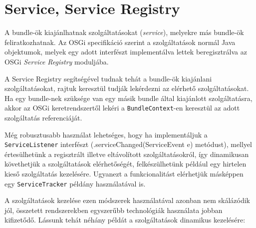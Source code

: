 \section{Service, Service Registry}
\label{sec:service}

A bundle-ök kiajánlhatnak szolgáltatásokat (\textit{service}), melyekre más bundle-ök feliratkozhatnak. Az OSGi specifikáció szerint a szolgáltatások normál Java objektumok, melyek egy adott interfészt implementálva lettek beregisztrálva az OSGi \textit{Service Registry} moduljába.

A Service Registry segítségével tudnak tehát a bundle-ök kiajánlani szolgáltatásokat, rajtuk keresztül tudják lekérdezni az elérhető szolgáltatásokat. Ha egy bundle-nek szüksége van egy másik bundle által kiajánlott szolgáltatásra, akkor az OSGi keretrendszertől lekéri a \texttt{BundleContext}-en keresztül az adott szolgáltatás referenciáját.

Még robusztusabb használat lehetséges, hogy ha implementáljuk a \texttt{ServiceListener} interfészt (.serviceChanged(ServiceEvent e) metódust), mellyel értesülhetünk a regisztrált illetve eltávolított szolgáltatásokról, így dinamikusan követhetjük a szolgáltatások elérhetőségét, felkészülhetünk például egy hirtelen kieső szolgáltatás kezelésére. Ugyanezt a funkcionalitást elérhetjük másképpen egy \texttt{ServiceTracker} példány használatával is.

A szolgáltatások kezelése ezen módszerek használatával azonban nem skálázódik jól, összetett rendszerekben egyszerűbb technológiák használata jobban kifizetődő. Lássunk tehát néhány példát a szolgáltatások dinamikus kezelésére:

